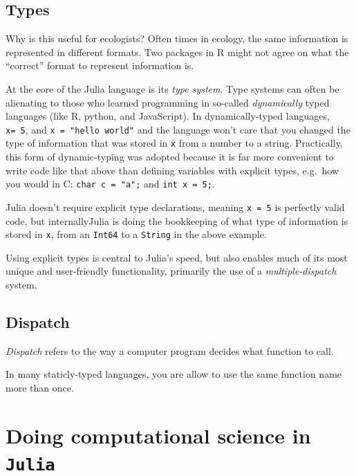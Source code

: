 \documentclass[10pt,oneside]{article}
\begin{document}
\hypertarget{types}{%
\subsection{Types}\label{types}}

Why is this useful for ecologists? Often times in ecology, the same
information is represented in different formats. Two packages in R might
not agree on what the ``correct'' format to represent information is.

At the core of the Julia language is its \emph{type system}. Type
systems can often be alienating to those who learned programming in
so-called \emph{dynamically} typed languages (like R, python, and
JavaScript). In dynamically-typed languages, \texttt{x=\ 5}, and
\texttt{x\ =\ "hello\ world"} and the language won't care that you
changed the type of information that was stored in \texttt{x} from a
number to a string. Practically, this form of dynamic-typing was adopted
because it is far more convenient to write code like that above than
defining variables with explicit types, e.g.~how you would in C:
\texttt{char\ c\ =\ "a";} and \texttt{int\ x\ =\ 5;}.

Julia doesn't require explicit type declarations, meaning
\texttt{x\ =\ 5} is perfectly valid code, but internallyJulia is doing
the bookkeeping of what type of information is stored in \texttt{x},
from an \texttt{Int64} to a \texttt{String} in the above example.

Using explicit types is central to Julia's speed, but also enables much
of its most unique and user-friendly functionality, primarily the use of
a \emph{multiple-dispatch} system.

\hypertarget{dispatch}{%
\subsection{Dispatch}\label{dispatch}}

\emph{Dispatch} refers to the way a computer program decides what
function to call.

In many staticly-typed languages, you are allow to use the same function
name more than once.

\hypertarget{doing-computational-science-in-julia}{%
\section{\texorpdfstring{Doing computational science in
\texttt{Julia}}{Doing computational science in Julia}}\label{doing-computational-science-in-julia}}
\end{document}
